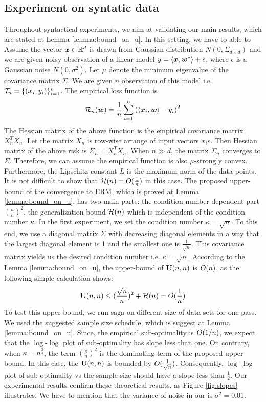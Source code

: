\documentclass{article}
\begin{document}
\subsection{Experiment on syntatic data}
Throughout syntactical experiments, we aim at validating our main results,
which are stated at Lemma \ref{lemma:bound_on_u}. In this setting, we have to able to 
Assume the vector $\bm{x} \in \mathbb{R}^d$ is drawn from Gaussian distribution $N(0,\Sigma_{d \times d})$ and we are given noisy observation of a linear model $y = \langle \bm{x}, \bm{w}^* \rangle + \epsilon$, where $\epsilon$ is a
Gaussian noise $N(0,\sigma^2)$. Let $\mu$ denote the minimum eigenvalue of the
covariance matrix $\Sigma$.
We are given $n$ observation of this model i.e.
 ${\cal T}_n = \{ 
(\bm{x}_i,y_i)\}_{i=1}^n$. The empirical loss function is 
\begin{equation*}
	{\cal R}_n(\bm{w}) = \frac{1}{n} \sum_{i=1}^n \left(\langle \bm{x}_i, \bm{w}\rangle -
	y_i\right)^2
\end{equation*}
The Hessian matrix of the above function is the empirical covariance matrix
$X_n^T X_n$.
Let the matrix $X_n$ is row-wise arrange of input vectors $x_i$s. Then
Hessian matrix of the above risk is $\Sigma_n = X_n^T X_n$. When $n \gg d$, the
matrix $\Sigma_n$ converges to $\Sigma$. Therefore, we can assume the
empirical function is also $\mu$-strongly convex. Furthermore, the Lipschitz
constant $L$ is the maximum norm of the data points. It is not difficult to
show that ${\cal H}(n) = O(\frac{1}{n})$ in this case.
The proposed upper-bound of the convergence to ERM, which is proved at Lemma
\ref{lemma:bound_on_u}, has two main parts: the condition number dependent part $(\frac{\kappa}{n})^2$, the
generalization bound ${\cal H}(n)$ which is independent of the condition number
$\kappa$. In the first experiment, we set the condition number $\kappa =
\sqrt{n}$. To this end, we use a diagonal matrix
$\Sigma$ with decreasing diagonal elements in a way that the largest diagonal
element is 1 and the smallest one is $\frac{1}{\sqrt{n}}$. This covariance
matrix yields us the desired condition number i.e. $\kappa = \sqrt{n}$.
According to the Lemma \ref{lemma:bound_on_u}, the upper-bound of $\mathbf U(n,n)$ is
$O(n)$, as the following simple calculation shows: 
\begin{equation*}
	\mathbf U(n,n) \leq (\frac{\sqrt{n}}{n})^2 + {\cal H}(n) = O(\frac{1}{n})
\end{equation*}
To test this upper-bound, we run saga on different size of data sets for one
pass. We used the suggested sample size schedule, which is suggest at Lemma
\ref{lemma:bound_on_u}. Since, the empirical sub-optimality is $O(1/n)$, we
expect that the $\log$-$\log$ plot of sub-optimality has slope less than one. On
contrary, when $\kappa = n^{\frac{3}{4}}$, the term $(\frac{\kappa}{n})^2$ is the
dominating term of the proposed upper-bound. In this case, the $\mathbf U(n,n)$ is
bounded by $O(\frac{1}{\sqrt{n}})$. Consequently, $\log$-$\log$ plot of
sub-optimality vs the sample size should have a slope less than $\frac{1}{2}$.
Our experimental results confirm these theoretical results, as Figure \ref{fig:slopes}
illustrates. We have to mention that the variance of noise in our is $\sigma^2
= 0.01$.
\end{document}
